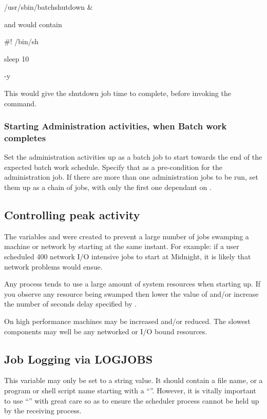 \begin{expara}

/usr/sbin/batchshutdown \&

\end{expara}

and  would contain

\begin{expara}

\#! /bin/sh

sleep 10

\BtquitName{} -y

\end{expara}

This would give the shutdown job time to complete, before invoking the \BtquitName{} command.

\subsubsection{Starting Administration activities, when Batch work completes}
Set the administration activities up as a batch job to start towards the end of the expected batch work schedule. Specify that
 as a pre-condition for the administration job. If there are more than one administration jobs to
be run, set them up as a chain of jobs, with only the first one dependant on .

\subsection{Controlling peak activity}
The variables  and  were created to prevent a large number of
jobs swamping a machine or network by starting at the same instant. For example: if a user scheduled 400 network I/O intensive jobs to start at
Midnight, it is likely that network problems would ensue.

Any process tends to use a large amount of system resources when starting up. If you observe any resource being swamped then lower the
value of  and/or increase the number of seconds delay specified by .

On high performance machines  may be increased and/or  reduced. The slowest components
may well be any networked or I/O bound resources.

\subsection{Job Logging via LOGJOBS}
This variable may only be set to a string value. It should contain a file name, or a program or shell script name starting with a
``\filename{{\textbar}}''. However, it is vitally important to use ``\filename{{\textbar}}'' with great care so as to ensure the scheduler
process cannot be held up by the receiving process.

